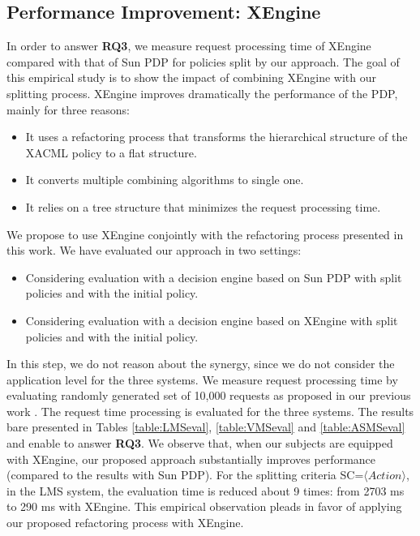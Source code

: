 \subsection{Performance Improvement: XEngine}
In order to answer \textbf{RQ3}, we measure request processing time of XEngine compared with that of Sun PDP
for policies split by our approach.
The goal of this empirical study is to show the impact of combining
XEngine with our splitting process. XEngine improves dramatically the performance of the PDP, mainly for
three reasons:
\begin{itemize}
\item It uses a refactoring process that transforms the hierarchical structure of the XACML policy to a flat structure.
\item  It converts multiple combining algorithms to single one.
\item  It relies on a tree structure that minimizes the request
processing time.
\end{itemize}
We propose to use XEngine conjointly with the refactoring process presented in this work. We have evaluated our approach in two settings:
\begin{itemize}
\item Considering evaluation with a decision engine based on Sun PDP with split policies and with the initial policy.
\item Considering evaluation with a decision engine based on XEngine with split policies and with the initial policy.
\end{itemize}
In this step, we do not reason about the synergy, since we do not consider the application level for the three systems. We measure request processing time by evaluating randomly generated set of 10,000 requests as proposed in our previous work \cite{request}.
The request time processing is evaluated for the three systems. The results bare presented in Tables \ref{table:LMSeval}, \ref{table:VMSeval} and \ref{table:ASMSeval} and enable to answer \textbf{RQ3}.
We observe that, when our subjects are equipped with XEngine, our proposed approach 
substantially improves performance (compared to the results with Sun PDP). For the splitting criteria SC=$\langle Action \rangle$,
in the LMS system, the evaluation time is reduced about 9 times: from 2703 ms to 290 ms with XEngine. This empirical 
observation pleads in favor of applying our proposed refactoring process with XEngine.
